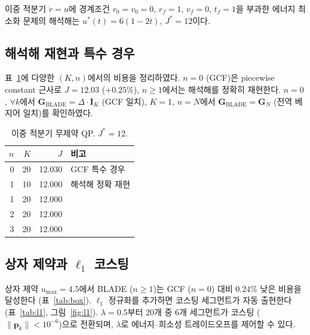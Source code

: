 \documentclass[11pt]{article}
\begin{document}
이중 적분기 $\ddot{r} = u$에 경계조건 $r_0 = v_0 = 0$, $r_f = 1$, $v_f = 0$,
$t_f = 1$을 부과한 에너지 최소화 문제의 해석해는
$u^*(t) = 6(1{-}2t)$, $J^* = 12$이다.


\subsection{해석해 재현과 특수 경우}

표~\ref{tab:analytic}에 다양한 $(K, n)$에서의 비용을 정리하였다.
$n = 0$ (GCF)은 piecewise constant 근사로 $J = 12.03$ ($+0.25\%$),
$n \ge 1$에서는 해석해를 정확히 재현한다.
$n = 0$, $\forall k$에서 $\mathbf{G}_{\text{BLADE}} = \Delta \cdot \mathbf{I}_K$ (GCF 일치),
$K = 1$, $n = N$에서 $\mathbf{G}_{\text{BLADE}} = \mathbf{G}_N$ (전역 베지어 일치)를 확인하였다.

\begin{table}[htb]
\centering
\caption{이중 적분기 무제약 QP. $J^* = 12$.}
\label{tab:analytic}
\begin{tabular}{rrrl}
\toprule
$n$ & $K$ & $J$ & 비고 \\
\midrule
0 & 20 & 12.030 & GCF 특수 경우 \\
1 & 10 & 12.000 & 해석해 정확 재현 \\
1 & 20 & 12.000 & \\
2 & 20 & 12.000 & \\
3 & 20 & 12.000 & \\
\bottomrule
\end{tabular}
\end{table}


\subsection{상자 제약과 $\ell_1$ 코스팅}

상자 제약 $u_{\max} = 4.5$에서 BLADE ($n \ge 1$)는 GCF ($n = 0$) 대비
$0.24\%$ 낮은 비용을 달성한다 (표~\ref{tab:box}).
$\ell_1$ 정규화를 추가하면 코스팅 세그먼트가 자동 출현한다 (표~\ref{tab:l1}, 그림~\ref{fig:l1}).
$\lambda = 0.5$부터 20개 중 6개 세그먼트가 코스팅 ($\|\mathbf{p}_k\| < 10^{-6}$)으로 전환되며,
$\lambda$로 에너지--희소성 트레이드오프를 제어할 수 있다.
\end{document}
